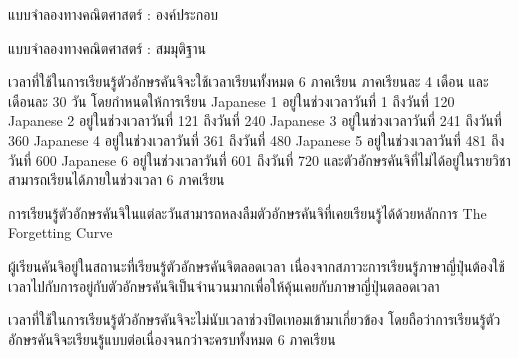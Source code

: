\documentclass{beamer}
\begin{document}
\begin{frame}{แบบจำลองทางคณิตศาสตร์ : องค์ประกอบ}

\begin{table}
\centering
{}
\end{table}
\end{frame}

\begin{frame}{แบบจำลองทางคณิตศาสตร์ : สมมุติฐาน} 
\begin{enumerate}
	{\scriptsize
	\item เวลาที่ใช้ในการเรียนรู้ตัวอักษรคันจิจะใช้เวลาเรียนทั้งหมด 6 ภาคเรียน ภาคเรียนละ 4 เดือน และเดือนละ 30 วัน โดยกำหนดให้การเรียน Japanese 1 อยู่ในช่วงเวลาวันที่ 1 ถึงวันที่ 120 Japanese 2 อยู่ในช่วงเวลาวันที่ 121 ถึงวันที่ 240 Japanese 3 อยู่ในช่วงเวลาวันที่ 241 ถึงวันที่ 360 Japanese 4 อยู่ในช่วงเวลาวันที่ 361 ถึงวันที่ 480 Japanese 5 อยู่ในช่วงเวลาวันที่ 481 ถึงวันที่ 600 Japanese 6 อยู่ในช่วงเวลาวันที่ 601 ถึงวันที่ 720 และตัวอักษรคันจิที่ไม่ได้อยู่ในรายวิชาสามารถเรียนได้ภายในช่วงเวลา 6 ภาคเรียน
	\item การเรียนรู้ตัวอักษรคันจิในแต่ละวันสามารถหลงลืมตัวอักษรคันจิที่เคยเรียนรู้ได้ด้วยหลักการ The Forgetting Curve
	\item ผู้เรียนคันจิอยู่ในสถานะที่เรียนรู้ตัวอักษรคันจิตลอดเวลา เนื่องจากสภาวะการเรียนรู้ภาษาญี่ปุ่นต้องใช้เวลาไปกับการอยู่กับตัวอักษรคันจิเป็นจำนวนมากเพื่อให้คุ้นเคยกับภาษาญี่ปุ่นตลอดเวลา
	\item เวลาที่ใช้ในการเรียนรู้ตัวอักษรคันจิจะไม่นับเวลาช่วงปิดเทอมเข้ามาเกี่ยวข้อง โดยถือว่าการเรียนรู้ตัวอักษรคันจิจะเรียนรู้แบบต่อเนื่องจนกว่าจะครบทั้งหมด 6 ภาคเรียน}
\end{enumerate}

\end{frame}
\end{document}
